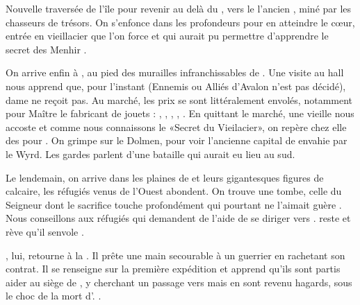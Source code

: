 \documentclass[11pt]{article}
\begin{document}
Nouvelle traversée de l'île pour revenir au delà du \bosquet{}, vers le l'ancien \tumulus{} , miné par les chasseurs de trésors. On s'enfonce dans les profondeurs pour en atteindre le c\oe{}ur, entrée en vieillacier que l'on force et qui aurait pu permettre d'apprendre le secret des Menhir .

On arrive enfin à \loincomtat{} , au pied des murailles infranchissables de \tuathan{}. Une visite au hall nous apprend que, pour l'instant (Ennemis ou Alliés d'Avalon n'est pas décidé), dame \kincaid{} ne reçoit pas. Au marché, les prix se sont littéralement envolés, notamment pour Maître \dobromir{} le fabricant de jouets : , , , , . En quittant le marché, une vieille nous accoste et comme nous connaissons le «Secret du Vieilacier», on repère chez elle des \gain{\outilspierre} pour \rich[2]. On grimpe sur le Dolmen, pour voir l'ancienne capital de \tuathan{} envahie par le Wyrd. Les gardes parlent d'une bataille qui aurait eu lieu au sud.


Le lendemain, on arrive dans les plaines de \debacle{}  et leurs gigantesques figures de calcaire, les réfugiés venus de l'Ouest abondent. On trouve une tombe, celle du Seigneur \yvain{} dont le sacrifice touche profondément \larve{} qui pourtant ne l'aimait guère . Nous conseillons aux réfugiés qui demandent de l'aide de se diriger vers \newcamelot{} . \larve{} reste et rève qu'il senvole .

\beor{}, lui,  retourne à la \foire{}. Il prête une main secourable  à un guerrier en rachetant son contrat. Il se renseigne sur la première expédition et apprend qu'ils sont partis aider au siège de \boismuraille{}, y cherchant un passage vers \tuathan{} mais en sont revenu hagards, sous le choc de la mort d'\yvain{}. .

\end{document}
